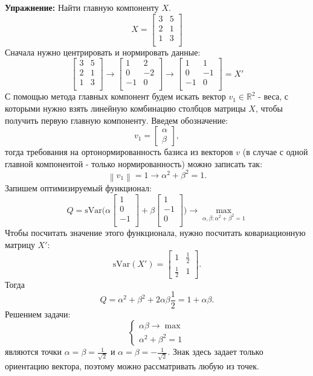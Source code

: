 \documentclass[12pt]{article} %
\theoremstyle{definition} %
\begin{document}
\textbf{Упражнение:} Найти главную компоненту $X$.
$$
X = 
\begin{bmatrix}
3 & 5\\
2 & 1\\
1 & 3\\
\end{bmatrix}
$$
Сначала нужно центрировать и нормировать данные:
$$
\begin{bmatrix}
3 & 5\\
2 & 1\\
1 & 3\\
\end{bmatrix}
\to
\begin{bmatrix}
1 & 2\\
0 & -2\\
-1 & 0\\
\end{bmatrix}
\to
\begin{bmatrix}
1 & 1\\
0 & -1\\
-1 & 0\\
\end{bmatrix}
=X'
$$
С помощью метода главных компонент будем искать вектор $v_1 \in \mathbb{R}^2$ - веса, с которыми нужно взять линейную комбинацию столбцов матрицы $X$, чтобы получить первую главную компоненту. Введем обозначение:
$$v_1
= \begin{bmatrix}
\alpha\\
\beta
\end{bmatrix},
$$
тогда требования на ортонормированность базиса из векторов $v$ (в случае с одной главной компонентой - только нормированность) можно записать так:
$$\left\| v_1 \right\| = 1 \to \alpha^2 + \beta^2 = 1.$$
Запишем оптимизируемый функционал:
$$
Q = \text{sVar} \bigg(
\alpha \begin{bmatrix}
1\\
0\\
-1\\
\end{bmatrix}
+
\beta \begin{bmatrix}
1\\
-1\\
0\\
\end{bmatrix}
\bigg)
\to \max_{\alpha, \beta : \alpha^2+\beta^2=1}
$$
Чтобы посчитать значение этого функционала, нужно посчитать ковариационную матрицу $X'$:
$$
\text{sVar}(X')=
\begin{bmatrix}
1&\frac{1}{2}\\
\frac{1}{2}&1
\end{bmatrix}.
$$
Тогда
$$Q = \alpha^2 + \beta^2 + 2\alpha \beta \frac{1}{2} = 1+\alpha \beta.$$
Решением задачи:
$$
\begin{cases}
\alpha \beta \to \max \\
\alpha^2 + \beta^2 = 1
\end{cases}
$$
являются точки $\alpha=\beta=\frac{1}{\sqrt{2}}$ и $\alpha=\beta=-\frac{1}{\sqrt{2}}$. Знак здесь задает только ориентацию вектора, поэтому можно рассматривать любую из точек.
\end{document}
